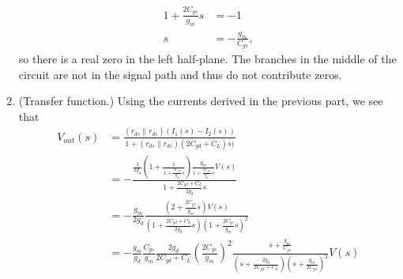 \documentclass{article}
\begin{document}
\begin{enumerate}
{\begin{align*}
          1 + \frac{2 C_{gs}}{g_m} s &= -1 \\
          s &= -\frac{g_m}{C_{gs}},
        \end{align*}
        so there is a real zero in the left half-plane.
        The branches in the middle of the circuit are not in the signal path
        and thus do not contribute zeros.
       }
  \item{(Transfer function.)
       Using the currents derived in the previous part, we see that
       \begin{align*}
       V_{out}(s) &= \frac{(r_{ds} \| r_{ds})(I_1(s) - I_2(s))}
                          {1 + (r_{ds} \| r_{ds})(2C_{gd} + C_L) s)} \\
                  &= -\frac{\frac{1}{2g_d}
                      \left(1 + \frac{1}{1 + \frac{2C_{gs}}{g_m}s}\right)
                      \frac{g_m}{1 + \frac{2 C_{gs}}{g_m}s} V(s)}
                          {1 + \frac{2C_{gd} + C_L}{2g_d}s} \\
                  &= -\frac{g_m}{2g_d}
                      \frac{(2 + \frac{2C_{gs}}{g_m}s)V(s)}
                           {(1 + \frac{2C_{gd} + C_L}{2g_d}s)(1 + \frac{2C_{gs}}{g_m}s)^2} \\
                  &= -\frac{g_m}{g_d}
                      \frac{C_{gs}}{g_m}
                      \frac{2g_d}{2C_{gd} + C_L}
                      \left(\frac{2C_{gs}}{g_m}\right)^2
                     \frac{s + \frac{g_m}{C_{gs}}}
                          {(s + \frac{2g_d}{2C_{gd} + C_L})
                           (s + \frac{g_m}{2C_{gs}})^2
                          }
                     V(s) 
       \end{align*}
       }
\end{enumerate}
\end{document}
